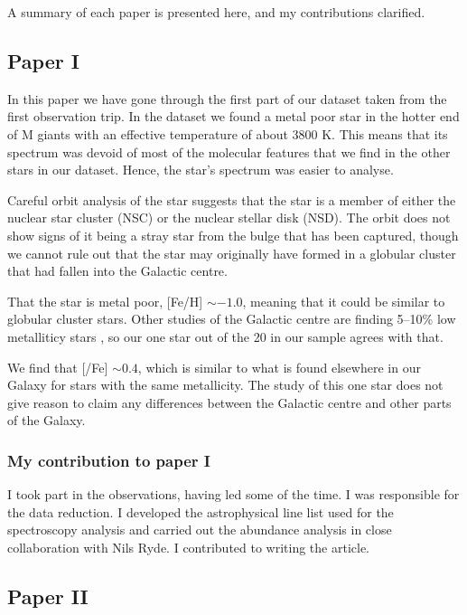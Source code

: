 
A summary of each paper is presented here, and my contributions clarified.

\subsection*{Paper I}

In this paper we have gone through the first part of our dataset taken from the first observation trip. In the dataset we found a metal poor star in the hotter end of M giants with an effective temperature of about 3800 K. This means that its spectrum was devoid of most of the molecular features that we find in the other stars in our dataset. Hence, the star's spectrum was easier to analyse.

Careful orbit analysis of the star suggests that the star is a member of either the nuclear star cluster (NSC) or the nuclear stellar disk (NSD). The orbit does not show signs of it being a stray star from the bulge that has been captured, though we cannot rule out that the star may originally have formed in a globular cluster that had fallen into the Galactic centre.

That the star is metal poor, [Fe/H] $\sim -1.0$, meaning that it could be similar to globular cluster stars. Other studies of the Galactic centre are finding 5--10\% low metalliticy stars \citep{Feldmeier-Krause2017,do:15}, so our one star out of the 20 in our sample agrees with that.

We find that [\textalpha/Fe] $\sim 0.4$, which is similar to what is found elsewhere in our Galaxy for stars with the same metallicity. The study of this one star does not give reason to claim any differences between the Galactic centre and other parts of the Galaxy.

\subsubsection*{My contribution to paper I}

I took part in the observations, having led some of the time. I was responsible for the data reduction. I developed the astrophysical line list used for the spectroscopy analysis and carried out the abundance analysis in close collaboration with Nils Ryde. I contributed to writing the article.


\subsection*{Paper II}


